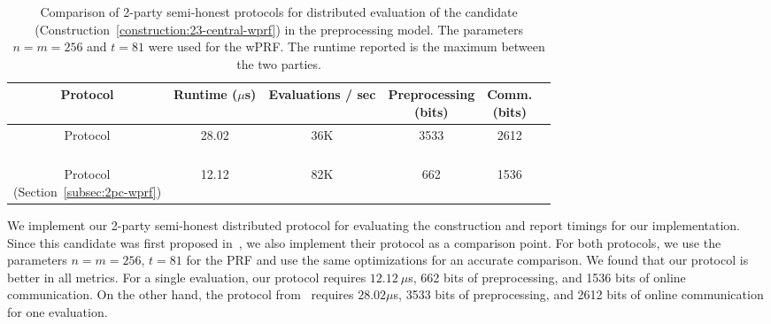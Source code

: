 
\begin{table}[t]
{
\centering
\begin{tabular}{|c|c|c|c|c|c|}
	\hline
	Protocol & Runtime ($\mu$s) & Evaluations / sec & \makecell{Preprocessing \\ (bits)} & \makecell{Comm. \\ (bits)} \\
	\hline
	\hline
	\makecell{\ttwPRF Protocol \\~\cite{boneh2018-darkmatter}} & 28.02 & 36K & 3533 & 2612 \\
	\hline
	\makecell{\ttwPRF Protocol \\ (Section~\ref{subsec:2pc-wprf})} & 12.12 & 82K & 662 & 1536 \\
	\hline	
\end{tabular}
\caption{Comparison of 2-party semi-honest protocols for distributed evaluation of the \ttwPRF candidate (Construction~\ref{construction:23-central-wprf}) in the preprocessing model. The parameters $n=m=256$ and $t=81$ were used for the wPRF. The runtime reported is the maximum between the two parties.}
\label{table:distributed_wprf}
}
\end{table}
\else
We implement our 2-party semi-honest distributed protocol for evaluating the \ttwPRF construction and report timings for our implementation. Since this candidate was first proposed in~\cite{boneh2018-darkmatter}, we also implement their protocol as a comparison point. For both protocols, we use the parameters $n=m=256$, $t=81$ for the PRF and use the same optimizations for an accurate comparison. We found that our protocol is better in all metrics. For a single evaluation, our protocol requires $12.12~\mu$s, 662 bits of preprocessing, and 1536 bits of online communication. On the other hand, the protocol from~\cite{boneh2018-darkmatter} requires $28.02\mu$s, 3533 bits of preprocessing, and 2612 bits of online communication for one evaluation.


